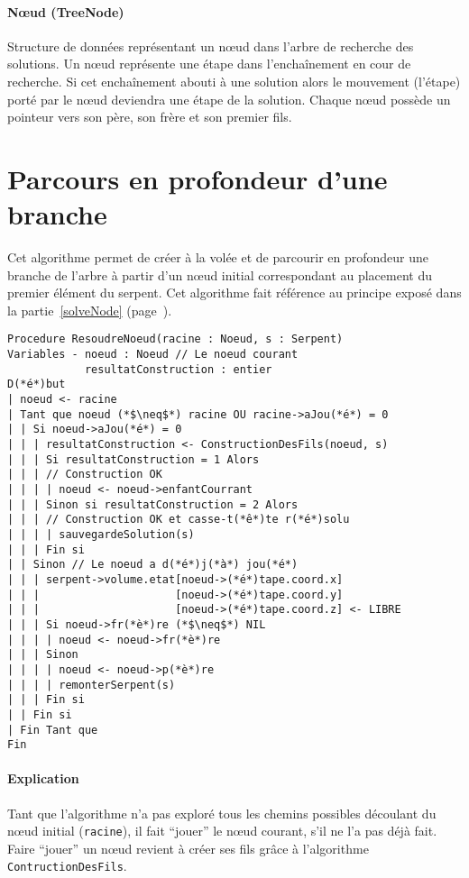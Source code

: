 \paragraph{Nœud (TreeNode)} Structure de données représentant un nœud dans l'arbre de recherche des solutions. Un nœud représente une étape dans l'enchaînement en cour de recherche. Si cet enchaînement abouti à une solution alors le mouvement (l'étape) porté par le nœud deviendra une étape de la solution.
Chaque nœud possède un pointeur vers son père, son frère et son premier fils.

\section{Parcours en profondeur d'une branche}
Cet algorithme permet de créer à la volée et de parcourir en profondeur une branche de l'arbre à partir d'un nœud initial correspondant au placement du premier élément du serpent. Cet algorithme fait référence au principe exposé dans la partie~\ref{solveNode} (page~\pageref{solveNode}).

\begin{lstlisting}[caption=Algorithme de résolution pour une branche]
Procedure ResoudreNoeud(racine : Noeud, s : Serpent)
Variables - noeud : Noeud // Le noeud courant
            resultatConstruction : entier
D(*é*)but
| noeud <- racine
| Tant que noeud (*$\neq$*) racine OU racine->aJou(*é*) = 0
| | Si noeud->aJou(*é*) = 0
| | | resultatConstruction <- ConstructionDesFils(noeud, s)
| | | Si resultatConstruction = 1 Alors
| | | // Construction OK
| | | | noeud <- noeud->enfantCourrant
| | | Sinon si resultatConstruction = 2 Alors
| | | // Construction OK et casse-t(*ê*)te r(*é*)solu 
| | | | sauvegardeSolution(s)
| | | Fin si
| | Sinon // Le noeud a d(*é*)j(*à*) jou(*é*)
| | | serpent->volume.etat[noeud->(*é*)tape.coord.x]
| | |                     [noeud->(*é*)tape.coord.y]
| | |                     [noeud->(*é*)tape.coord.z] <- LIBRE
| | | Si noeud->fr(*è*)re (*$\neq$*) NIL
| | | | noeud <- noeud->fr(*è*)re
| | | Sinon
| | | | noeud <- noeud->p(*è*)re
| | | | remonterSerpent(s)
| | | Fin si
| | Fin si
| Fin Tant que
Fin
\end{lstlisting}

\newpage
\paragraph{Explication}
Tant que l'algorithme n'a pas exploré tous les chemins possibles découlant du nœud initial (\verb|racine|), il fait ``jouer'' le nœud courant, s'il ne l'a pas déjà fait. Faire ``jouer'' un nœud revient à créer ses fils grâce à l'algorithme \verb|ContructionDesFils|. 


